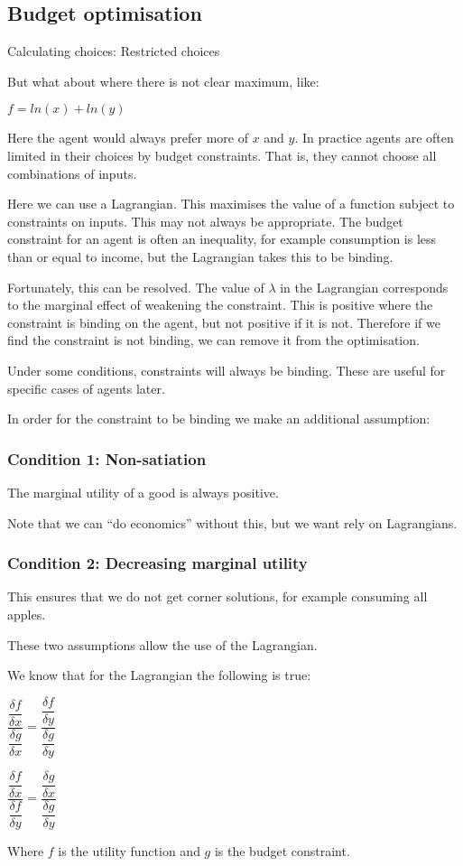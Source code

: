 
\subsection{Budget optimisation}

Calculating choices: Restricted choices

But what about where there is not clear maximum, like:

\(f=ln(x)+ln(y)\)

Here the agent would always prefer more of \(x\) and \(y\). In practice agents are often limited in their choices by budget constraints. That is, they cannot choose all combinations of inputs.

Here we can use a Lagrangian. This maximises the value of a function subject to constraints on inputs. This may not always be appropriate. The budget constraint for an agent is often an inequality, for example consumption is less than or equal to income, but the Lagrangian takes this to be binding.

Fortunately, this can be resolved. The value of \(\lambda \) in the Lagrangian corresponds to the marginal effect of weakening the constraint. This is positive where the constraint is binding on the agent, but not positive if it is not. Therefore if we find the constraint is not binding, we can remove it from the optimisation.

Under some conditions, constraints will always be binding. These are useful for specific cases of agents later.

In order for the constraint to be binding we make an additional assumption:

\subsubsection{Condition 1: Non-satiation}

The marginal utility of a good is always positive.

Note that we can “do economics” without this, but we want rely on Lagrangians.

\subsubsection{Condition 2: Decreasing marginal utility}

This ensures that we do not get corner solutions, for example consuming all apples.

These two assumptions allow the use of the Lagrangian.

We know that for the Lagrangian the following is true:

\(\dfrac{\dfrac{\delta f}{\delta x}}{\dfrac{\delta g}{\delta x}}=\dfrac{\dfrac{\delta f}{\delta y}}{\dfrac{\delta g}{\delta y}}\)

\(\dfrac{\dfrac{\delta f}{\delta x}}{\dfrac{\delta f}{\delta y}}=\dfrac{\dfrac{\delta g}{\delta x}}{\dfrac{\delta g}{\delta y}}\)

Where \(f\) is the utility function and \(g\) is the budget constraint.

